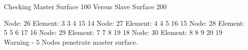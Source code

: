  Checking Master Surface   100 Versus Slave Surface   200

 Node:    26 Element:     3      3      4     15     14
 Node:    27 Element:     4      4      5     16     15
 Node:    28 Element:     5      5      6     17     16
 Node:    29 Element:     7      7      8     19     18
 Node:    30 Element:     8      8      9     20     19
 Warning -    5 Nodes penetrate master surface.
